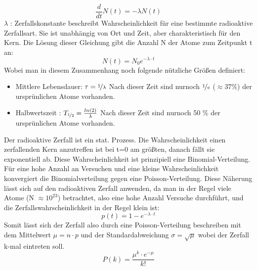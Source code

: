 \documentclass[Ex4_Zusammenfassung.tex]{subfiles}
\begin{document}
\begin{itemize}
\begin{equation}
\frac{d}{dt} N(t) = - \lambda N(t) 
\end{equation}
$ \lambda $ : Zerfallskonstante beschreibt Wahrscheinlichkeit für eine bestimmte radioaktive Zerfallsart. Sie ist unabhängig von Ort und Zeit, aber charakteristisch für den Kern. \newline
Die Lösung dieser Gleichung gibt die Anzahl N der Atome zum Zeitpunkt t an: 
\begin{equation}
N(t) = N_{0} e^{-\lambda \cdot t}
\end{equation}  \newpage
Wobei man in diesem Zusammenhang noch folgende nützliche Größen definiert: 
\begin{itemize}
\item Mittlere Lebensdauer: $ \tau = \nicefrac{1}{\lambda} $ \newline 
Nach dieser Zeit sind nurnoch $\nicefrac{1}{e} $ ($ \approx 37 \% $) der ursprünlichen Atome vorhanden.
\item Halbwertszeit : $ T_{\nicefrac{1}{2}} = \frac{ln(2)}{\lambda} $
Nach dieser Zeit sind nurnoch 50 \% der ursprünlichen Atome vorhanden.
\end{itemize}
\end{itemize}
Der radioaktive Zerfall ist ein stat. Prozess. Die Wahrscheinlichkeit einen zerfallenden Kern anzutreffen ist bei t=0 am größten, danach fällt sie exponentiell ab. 
Diese Wahrscheinlichkeit ist prinzipiell eine Binomial-Verteilung. Für eine hohe Anzahl an Versuchen und eine kleine Wahrscheinlichkeit konvergiert die Binomialverteilung gegen eine Poisson-Verteilung. Diese Näherung lässt sich auf den radioaktiven Zerfall anwenden, da man in der Regel viele Atome (N $\approx 10^{23} $) betrachtet, also eine hohe Anzahl Versuche durchführt, und die Zerfallswahrscheinlichkeit in der Regel klein ist: 
\begin{equation}
p(t) = 1 - e^{-\lambda \cdot t} 
\end{equation}
Somit lässt sich der Zerfall also durch eine Poisson-Verteilung beschreiben mit dem Mittelwert $ \mu = n\cdot p $ und der Standardabweichung  $ \sigma = \sqrt{\mu} $ wobei der Zerfall k-mal eintreten soll. 
\begin{equation}
P(k) = \frac{\mu^k \cdot e^{-\mu} } {k!} 
\end{equation}
\end{document}
